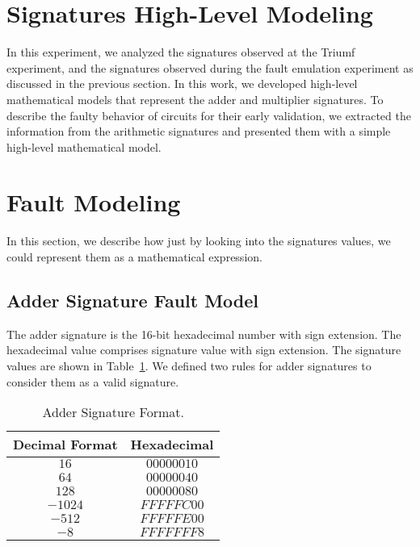 \section{
Signatures High-Level Modeling}
In this experiment, we analyzed the signatures observed at the Triumf experiment, and the signatures observed during the fault emulation experiment as discussed in the previous section.
In this work, we developed high-level mathematical models that represent the adder and multiplier signatures. To describe the faulty behavior of circuits for their early validation, we extracted the information from the arithmetic signatures and presented them with a simple high-level mathematical model.
\section{Fault Modeling}
In this section, we describe how just by looking into the signatures values, we could represent them as a mathematical expression.

\subsection{Adder Signature Fault Model}
The adder signature is the 16-bit hexadecimal number with sign extension. The hexadecimal value comprises signature value with sign extension. The signature values are shown in Table~\ref{adder signature format}. We defined two rules for adder signatures to consider them as a valid signature.
\begin{table}[tb!]
\center
\caption{Adder Signature Format.}
\label{adder signature format}
\begin{tabular}{|c | c |} 
 \hline
Decimal Format & Hexadecimal   \\ 
\hline
 
 
 $16$& $00000010$    \\
 \hline
 $64$ & $00000040$  \\ 
 \hline
 
 $128$ & $00000080$  \\
 \hline
 $-1024$ & $FFFFFC00$ \\
 \hline
 $-512$ & $FFFFFE00$ \\
 \hline
 $-8$ & $FFFFFFF8$   \\
 \hline
 
 
\end{tabular}
\end{table}


